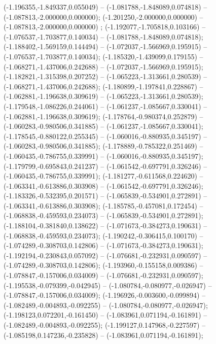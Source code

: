  (-1.196355,-1.849337,0.055049) -- (-1.081788,-1.848089,0.074818) -- (-1.087813,-2.000000,0.000000);
 (-1.201250,-2.000000,0.000000) -- (-1.087813,-2.000000,0.000000) ;
 (-1.192077,-1.705818,0.103166) -- (-1.076537,-1.703877,0.140034) -- (-1.081788,-1.848089,0.074818);
 (-1.188402,-1.569159,0.144494) -- (-1.072037,-1.566969,0.195915) -- (-1.076537,-1.703877,0.140034);
 (-1.185320,-1.439099,0.179155) -- (-1.068271,-1.437006,0.242688) -- (-1.072037,-1.566969,0.195915);
 (-1.182821,-1.315398,0.207252) -- (-1.065223,-1.313661,0.280539) -- (-1.068271,-1.437006,0.242688);
 (-1.180899,-1.197841,0.228867) -- (-1.062881,-1.196638,0.309619) -- (-1.065223,-1.313661,0.280539);
 (-1.179548,-1.086226,0.244061) -- (-1.061237,-1.085667,0.330041) -- (-1.062881,-1.196638,0.309619);
 (-1.178764,-0.980374,0.252879) -- (-1.060283,-0.980506,0.341885) -- (-1.061237,-1.085667,0.330041);
 (-1.178545,-0.880122,0.255345) -- (-1.060016,-0.880935,0.345197) -- (-1.060283,-0.980506,0.341885);
 (-1.178889,-0.785322,0.251469) -- (-1.060435,-0.786755,0.339991) -- (-1.060016,-0.880935,0.345197);
 (-1.179799,-0.695843,0.241237) -- (-1.061542,-0.697791,0.326246) -- (-1.060435,-0.786755,0.339991);
 (-1.181277,-0.611568,0.224620) -- (-1.063341,-0.613886,0.303908) -- (-1.061542,-0.697791,0.326246);
 (-1.183326,-0.532395,0.201571) -- (-1.065839,-0.534901,0.272891) -- (-1.063341,-0.613886,0.303908);
 (-1.185785,-0.457081,0.172454) -- (-1.068838,-0.459593,0.234073) -- (-1.065839,-0.534901,0.272891);
 (-1.188104,-0.381840,0.138622) -- (-1.071673,-0.384273,0.190631) -- (-1.068838,-0.459593,0.234073);
 (-1.190242,-0.306415,0.100170) -- (-1.074289,-0.308703,0.142806) -- (-1.071673,-0.384273,0.190631);
 (-1.192194,-0.230843,0.057092) -- (-1.076681,-0.232931,0.090597) -- (-1.074289,-0.308703,0.142806);
 (-1.193960,-0.155158,0.009386) -- (-1.078847,-0.157006,0.034009) -- (-1.076681,-0.232931,0.090597);
 (-1.195538,-0.079399,-0.042945) -- (-1.080784,-0.080977,-0.026947) -- (-1.078847,-0.157006,0.034009);
 (-1.196926,-0.003600,-0.099894) -- (-1.082489,-0.004893,-0.092255) -- (-1.080784,-0.080977,-0.026947);
 (-1.198123,0.072201,-0.161450) -- (-1.083961,0.071194,-0.161891) -- (-1.082489,-0.004893,-0.092255);
 (-1.199127,0.147968,-0.227597) -- (-1.085198,0.147236,-0.235828) -- (-1.083961,0.071194,-0.161891);
